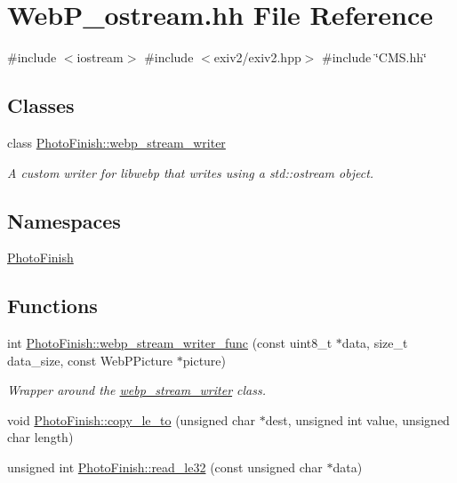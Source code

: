 \hypertarget{_web_p__ostream_8hh}{}\section{Web\+P\+\_\+ostream.\+hh File Reference}
\label{_web_p__ostream_8hh}
{\ttfamily \#include $<$iostream$>$}\newline
{\ttfamily \#include $<$exiv2/exiv2.\+hpp$>$}\newline
{\ttfamily \#include \char`\"{}C\+M\+S.\+hh\char`\"{}}\newline
\subsection*{Classes}
\begin{DoxyCompactItemize}
\item 
class \hyperlink{class_photo_finish_1_1webp__stream__writer}{Photo\+Finish\+::webp\+\_\+stream\+\_\+writer}
\begin{DoxyCompactList}\small\item\em A custom writer for libwebp that writes using a std\+::ostream object. \end{DoxyCompactList}\end{DoxyCompactItemize}
\subsection*{Namespaces}
\begin{DoxyCompactItemize}
\item 
 \hyperlink{namespace_photo_finish}{Photo\+Finish}
\end{DoxyCompactItemize}
\subsection*{Functions}
\begin{DoxyCompactItemize}
\item 
int \hyperlink{namespace_photo_finish_a1e5838b47b653916bf48abe8aae872ec}{Photo\+Finish\+::webp\+\_\+stream\+\_\+writer\+\_\+func} (const uint8\+\_\+t $\ast$data, size\+\_\+t data\+\_\+size, const Web\+P\+Picture $\ast$picture)
\begin{DoxyCompactList}\small\item\em Wrapper around the \hyperlink{class_photo_finish_1_1webp__stream__writer}{webp\+\_\+stream\+\_\+writer} class. \end{DoxyCompactList}\item 
void \hyperlink{namespace_photo_finish_a768e4da23a5f8e540e63856631c5e036}{Photo\+Finish\+::copy\+\_\+le\+\_\+to} (unsigned char $\ast$dest, unsigned int value, unsigned char length)
\item 
unsigned int \hyperlink{namespace_photo_finish_a4c7726ccf8c39b9b415203df8a2cdbe9}{Photo\+Finish\+::read\+\_\+le32} (const unsigned char $\ast$data)
\end{DoxyCompactItemize}
